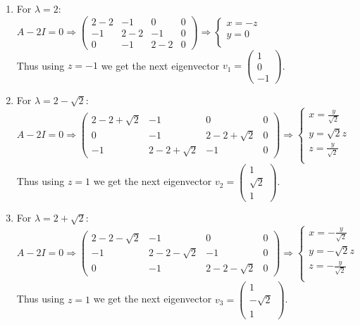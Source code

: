 \documentclass{article}
\begin{document}
	\begin{enumerate}
		\item For $\lambda=2$:\\
		$
		A-2I=0 \Rightarrow
		\left(\begin{array}{ccc|c}
		2-2 & -1 & 0 & 0 \\ 
		-1 & 2-2 & -1 & 0\\ 
		0 & -1 & 2-2 & 0
		\end{array}\right)
		\Rightarrow \left\{
		\begin{array}{cc}
		x=-z\\
		y=0\\
		\end{array}\right.
		$\\
		Thus using $z=-1$ we get the next eigenvector $v_1=\begin{pmatrix}1 \\0\\ -1\end{pmatrix}$.

		\item For $\lambda=2-\sqrt{2}$:\\
		$
		A-2I=0 \Rightarrow
		\left(\begin{array}{ccc|c}
		2-2+\sqrt{2} & -1 & 0 & 0 \\
		0 & -1 & 2-2+\sqrt{2} & 0 \\
		-1 & 2-2+\sqrt{2} & -1 & 0 
		\end{array}\right)
		\Rightarrow \left\{
		\begin{array}{cc}
		x=\frac{y}{\sqrt{2}}\\
		y=\sqrt{2}z\\
		z=\frac{y}{\sqrt{2}}\\
		\end{array}\right.
		$\\
		Thus using $z=1$ we get the next eigenvector $v_2=\begin{pmatrix}1 \\\sqrt{2}\\ 1\end{pmatrix}$.
		
		\item For $\lambda=2+\sqrt{2}$:\\
		$
		A-2I=0 \Rightarrow
		\left(\begin{array}{ccc|c}
		2-2-\sqrt{2} & -1 & 0 & 0 \\ 
		-1 & 2-2-\sqrt{2} & -1 & 0\\ 
		0 & -1 & 2-2-\sqrt{2} & 0
		\end{array}\right)
		\Rightarrow \left\{
		\begin{array}{cc}
		x=-\frac{y}{\sqrt{2}}\\
		y=-\sqrt{2}z\\
		z=-\frac{y}{\sqrt{2}}\\
		\end{array}\right.
		$\\
		Thus using $z=1$ we get the next eigenvector $v_3=\begin{pmatrix}1 \\-\sqrt{2} \\ 1\end{pmatrix}$.
	\end{enumerate}
\end{document}
